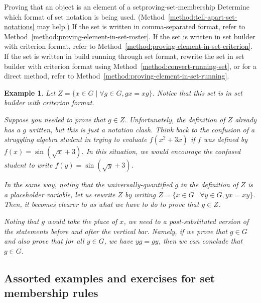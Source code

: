 \documentclass{book}
\newcounter{ekcounter}%
\theoremstyle{ekimcustom}
\newtheorem{example}[ekcounter]{Example}
\begin{document}
\begin{bmethod}{Proving that an object is an element of a set}{proving-set-membership}
Determine which format of set notation is being used. (Method~\ref{method:tell-apart-set-notations} may help.)
If the set is written in comma-separated format, refer to Method~\ref{method:proving-element-in-set-roster}.
If the set is written in set builder with criterion format, refer to Method~\ref{method:proving-element-in-set-criterion}.
If the set is written in build running through set format, rewrite the set in set builder with criterion format using Method~\ref{method:convert-running-set}, or for a direct method, refer to Method~\ref{method:proving-element-in-set-running}.
\end{bmethod}
\begin{example}
Let $Z =\{x \in G \mid \forall g \in G, gx=xg\}$. Notice that this set is in set builder with criterion format.

Suppose you needed to prove that $g \in Z$. Unfortunately, the definition of $Z$ already has a $g$ written, but this is just a notation clash. Think back to the confusion of a struggling algebra student in trying to evaluate $f(x^2+3x)$ if $f$ was defined by $f(x)=\sin(\sqrt{x}+3)$. In this situation, we would encourage the confused student to write $f(y)=\sin(\sqrt{y}+3)$.

In the same way, noting that the universally-quantified $g$ in the definition of $Z$ is a placeholder variable, let us rewrite $Z$ by writing $Z =\{x \in G \mid \forall y \in G, yx=xy\}$. Then, it becomes clearer to us what we have to do to prove that $g \in Z$.

Noting that $g$ would take the place of $x$, we need to a post-substituted version of the statements before and after the vertical bar. Namely, if we prove that $g \in G$ and also prove that for all $y \in G$, we have $yg=gy$, then we can conclude that $g \in G$.
\end{example}

\subsection{Assorted examples and exercises for set membership rules}
\end{document}
